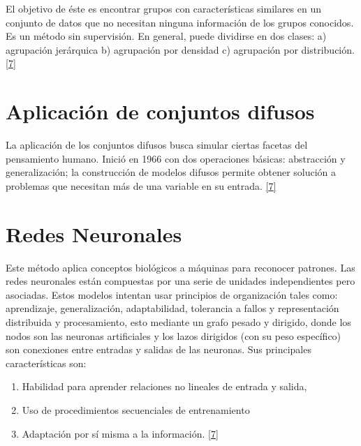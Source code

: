 \documentclass[12pt,spanish,Letterpaper,openany]{book}
\newcommand{\spacetwomilis}{\vspace{2mm}}
\begin{document}
\spacetwomilis

El objetivo de éste es encontrar grupos con características similares en un conjunto de datos que no necesitan ninguna información de los grupos conocidos. Es un método sin supervisión. En general, puede dividirse en dos clases: a) agrupación jerárquica b) agrupación por densidad c) agrupación por distribución. \protect\hyperlink{articulo12_ref07}{{[}7{]}}

\hypertarget{aplicaciuxf3n-de-conjuntos-difusos}{%
\section{Aplicación de conjuntos difusos}\label{aplicaciuxf3n-de-conjuntos-difusos}}

La aplicación de los conjuntos difusos busca simular ciertas facetas del pensamiento humano. Inició en 1966 con dos operaciones básicas: abstracción y generalización; la construcción de modelos difusos permite obtener solución a problemas que necesitan más de una variable en su entrada. \protect\hyperlink{articulo12_ref07}{{[}7{]}}

\hypertarget{redes-neuronales}{%
\section{Redes Neuronales}\label{redes-neuronales}}

Este método aplica conceptos biológicos a máquinas para reconocer patrones. Las redes neuronales están compuestas por una serie de unidades independientes pero asociadas. Estos modelos intentan usar principios de organización tales como: aprendizaje, generalización, adaptabilidad, tolerancia a fallos y representación distribuida y procesamiento, esto mediante un grafo pesado y dirigido, donde los nodos son las neuronas artificiales y los lazos dirigidos (con su peso específico) son conexiones entre entradas y salidas de las neuronas. Sus principales características son:

\begin{enumerate}
\def\labelenumi{\arabic{enumi}.}
\item
  Habilidad para aprender relaciones no lineales de entrada y salida,
\item
  Uso de procedimientos secuenciales de entrenamiento
\item
  Adaptación por sí misma a la información. \protect\hyperlink{articulo12_ref07}{{[}7{]}}
\end{enumerate}
\end{document}
